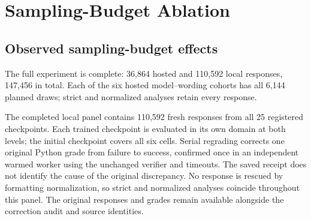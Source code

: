 \documentclass{article}
\newcommand{\1}{\mathbf 1}
\theoremstyle{remark}
\theoremstyle{definition}
\theoremstyle{plain}
\begin{document}
\section{Sampling-Budget Ablation}
\label{app:sampling-budget-ablation}







\subsection{Observed sampling-budget effects}
\label{app:sampling-budget-effects}

The full experiment is complete: 36,864 hosted and 110,592 local responses,
147,456 in total. Each of the six hosted model--wording cohorts has all
6,144 planned draws; strict and normalized analyses retain every response.

The completed local panel contains 110,592 fresh responses from all 25
registered checkpoints. Each trained checkpoint is evaluated in its own domain
at both levels; the initial checkpoint covers all six cells. Serial regrading
corrects one original Python grade from failure to success, confirmed once
in an independent warmed worker using the unchanged verifier and timeouts.
The saved receipt does not identify the cause of the original discrepancy.
No response is rescued by formatting normalization, so strict and normalized
analyses coincide throughout this panel. The original responses and grades
remain available alongside the correction audit and source identities.
\end{document}
